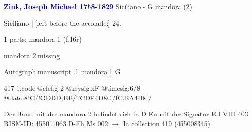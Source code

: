 \documentclass[twocolumn]{book}
\begin{document}
\newline \par \vspace{7pt} \textcolor{darkblue}{\textbf{Zink, Joseph Michael  1758-1829}}
\newline Siciliano - G
\newline mandora (2)
\newline \begin{itshape}[f.16r, at left:] Siciliano | [left before the accolade:] 24.\end{itshape} 
\newline \textcolor{darkblue}{}  1 parts: mandora 1  (f.16r)
\newline \begin{small} mandora 2 missing\end{small} 
\newline Autograph manuscript
.1  mandora 1  G  
\begin{filecontents*}{417-1.code}
@clef:g-2
@keysig:xF
@timesig:6/8
@data:8'G/!GDDD,BB/!'CDE4D8G/fC,BA4B8-/
\end{filecontents*}
\newline
%

\newline Der Band mit der mandora 2 befindet sich in D Eu mit der Signatur Esl VIII 403
\newline RISM-ID: 455011063
\newline D-Fh  Ms 002
\newline $\rightarrow$ In collection 419 (455008345)
      
\end{document}
